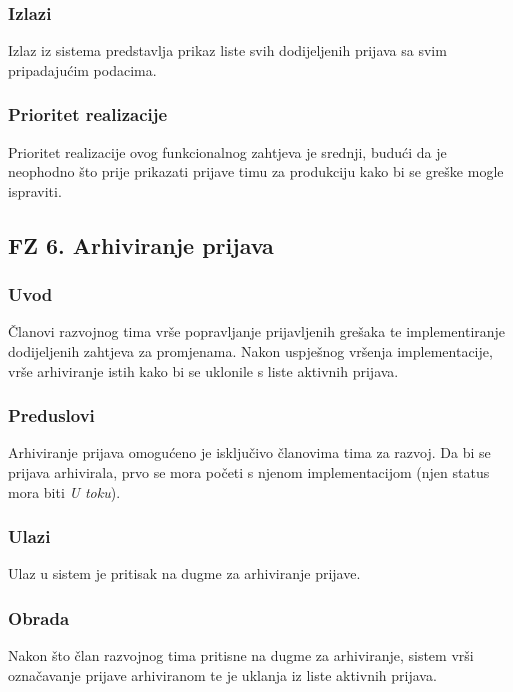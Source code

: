 \documentclass[12pt,a4paper]{article}
\begin{document}
\subsubsection{Izlazi}

Izlaz iz sistema predstavlja prikaz liste svih dodijeljenih prijava sa svim pripadajućim podacima.

\subsubsection{Prioritet realizacije}

Prioritet realizacije ovog funkcionalnog zahtjeva je srednji, budući da je neophodno što prije prikazati prijave timu za produkciju kako bi se greške mogle ispraviti.

\subsection{FZ 6. Arhiviranje prijava}

\subsubsection{Uvod}

Članovi razvojnog tima vrše popravljanje prijavljenih grešaka te implementiranje dodijeljenih zahtjeva za promjenama. Nakon uspješnog vršenja implementacije, vrše arhiviranje istih kako bi se uklonile s liste aktivnih prijava.

\subsubsection{Preduslovi}

Arhiviranje prijava omogućeno je isključivo članovima tima za razvoj. Da bi se prijava arhivirala, prvo se mora početi s njenom implementacijom (njen status mora biti \textit{U toku}).

\subsubsection{Ulazi}

Ulaz u sistem je pritisak na dugme za arhiviranje prijave.

\subsubsection{Obrada}

Nakon što član razvojnog tima pritisne na dugme za arhiviranje, sistem vrši označavanje prijave arhiviranom te je uklanja iz liste aktivnih prijava.
\end{document}
